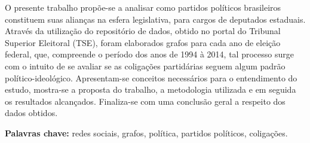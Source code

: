O presente trabalho  propõe-se a analisar como partidos políticos brasileiros constituem suas alianças na esfera legislativa, para cargos de deputados estaduais. Através da utilização do repositório de dados, obtido no portal do Tribunal Superior Eleitoral (TSE), foram elaborados grafos para cada ano de eleição federal, que, compreende o período dos anos de 1994 à 2014, tal processo surge com o intuito de se avaliar se as coligações partidárias seguem algum padrão político-ideológico. Apresentam-se conceitos necessários para o entendimento do estudo, mostra-se a proposta do trabalho, a metodologia utilizada e em seguida os resultados alcançados. Finaliza-se com uma conclusão geral a respeito dos dados obtidos.



\textbf{Palavras chave:} redes sociais, grafos, política, partidos políticos, coligações.
